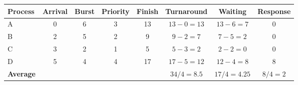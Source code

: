 \begin{tabular}{@{}lccccccc@{}}
\toprule
\textbf{Process} & \textbf{Arrival} & \textbf{Burst} & \textbf{Priority} & \textbf{Finish} & \textbf{Turnaround} & \textbf{Waiting} & \textbf{Response}\\
\midrule
A & 0 & 6 & 3 & 13 & $13-0=13$ & $13-6=7$ & 0\\
B & 2 & 5 & 2 & 9 & $9-2=7$ & $7-5=2$ & 0\\
C & 3 & 2 & 1 & 5 & $5-3=2$ & $2-2=0$ & 0\\
D & 5 & 4 & 4 & 17 & $17-5=12$ & $12-4=8$ & 8\\
\midrule
\textbf{Average} &  &  &  &  & $34/4=8.5$ & $17/4=4.25$ & $8/4=2$\\
\bottomrule
\end{tabular}
